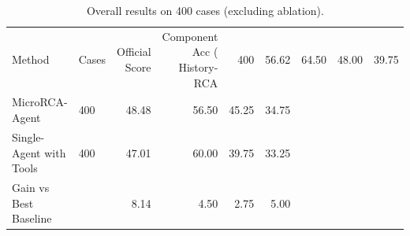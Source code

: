 \begin{table}[t]
\centering
\caption{Overall results on 400 cases (excluding ablation).}
\label{tab:overall_non_ablation}
\begin{tabular}{llrrrr}
\toprule
Method & Cases & Official Score & Component Acc (%
\midrule
History-RCA & 400 & 56.62 & 64.50 & 48.00 & 39.75 \\
MicroRCA-Agent & 400 & 48.48 & 56.50 & 45.25 & 34.75 \\
Single-Agent with Tools & 400 & 47.01 & 60.00 & 39.75 & 33.25 \\
Gain vs Best Baseline &  & 8.14 & 4.50 & 2.75 & 5.00 \\
\bottomrule
\end{tabular}
\end{table}
